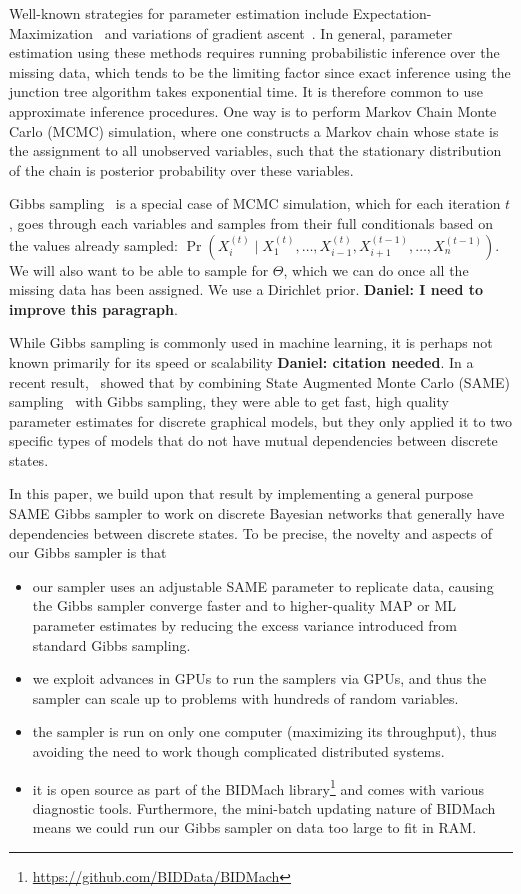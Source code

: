 \documentclass{article} %
\begin{document}
Well-known strategies for parameter estimation include Expectation-Maximization~\citep{EMpaper} and
variations of gradient ascent~\citep{Thiesson95}. In general, parameter estimation using these
methods requires running probabilistic inference over the missing data, which tends to be the
limiting factor since  exact inference using the junction tree algorithm takes exponential time. It
is therefore common to use approximate inference procedures.  One way is to perform Markov Chain
Monte Carlo (MCMC) simulation, where one constructs a Markov chain whose state is the assignment to
all unobserved variables, such that the stationary distribution of the chain is posterior
probability over these variables.

Gibbs sampling~\citep{Geman1984} is a special case of MCMC simulation, which for each iteration $t$,
goes through each variables and samples from their full conditionals based on the values already
sampled: $\Pr(X_i^{(t)} \mid X_1^{(t)}, \ldots, X_{i-1}^{(t)}, X_{i+1}^{(t-1)}, \ldots,
X_n^{(t-1)})$. We will also want to be able to sample for $\Theta$, which we can do once all the
missing data has been assigned. We use a Dirichlet prior.  \textbf{Daniel: I need to improve this
paragraph}.

While Gibbs sampling is commonly used in machine learning, it is perhaps not known primarily for its
speed or scalability \textbf{Daniel: citation needed}. In a recent result,~\citet{SAME2015} showed
that by combining State Augmented Monte Carlo (SAME) sampling~\citep{SAME2002} with Gibbs sampling,
they were able to get fast, high quality parameter estimates for discrete graphical models, but they
only applied it to two specific types of models that do not have mutual dependencies between
discrete states.

In this paper, we build upon that result by implementing a general purpose SAME Gibbs sampler to
work on discrete Bayesian networks that generally have dependencies between discrete states. To be
precise, the novelty and aspects of our Gibbs sampler is that

\begin{itemize}[noitemsep]
    \item our sampler uses an adjustable SAME parameter to replicate data, causing the Gibbs
    sampler converge faster and to higher-quality MAP or ML parameter estimates by reducing the
    excess variance introduced from standard Gibbs sampling.
    \item we exploit advances in GPUs to run the samplers via GPUs, and thus the sampler can scale
    up to problems with hundreds of random variables.
    \item the sampler is run on only one computer (maximizing its throughput), thus avoiding the
    need to work though complicated distributed systems.
    \item it is open source as part of the BIDMach
    library\footnote{\url{https://github.com/BIDData/BIDMach}} and comes with various diagnostic
    tools. Furthermore, the mini-batch updating nature of BIDMach means we could run our Gibbs
    sampler on data too large to fit in RAM.
\end{itemize}
\end{document}
